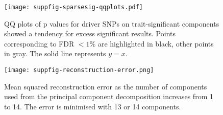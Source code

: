 \documentclass[11pt]{article}
\begin{document}
\begin{figure}
  \centering
  \texttt{[image: suppfig-sparsesig-qqplots.pdf]}
  \caption{QQ plots of p values for driver SNPs on trait-significant components showed a tendency for excess significant results. Points corresponding to FDR $< 1\%$ are highlighted in black, other points in gray. The solid line represents $y=x$.}
  \label{sfig:4}
\end{figure}


\begin{figure}
  \centering
  \texttt{[image: suppfig-reconstruction-error.png]}
  \caption{Mean squared reconstruction error as the number of components used from the principal component decomposition increases from 1 to 14. The error is minimised with 13 or 14 components.}
  \label{fig:recon-error}
\end{figure}
\end{document}

